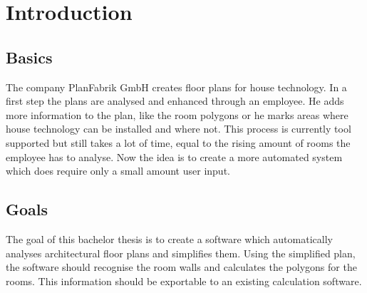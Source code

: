 \chapter{Introduction}
\section{Basics}
The company PlanFabrik GmbH creates floor plans for house technology. In a first step the plans are analysed and enhanced through an employee. He adds more information to the plan, like the room polygons or he marks areas where house technology can be installed and where not.
\newline
\newline
This process is currently tool supported but still takes a lot of time, equal to the rising amount of rooms the employee has to analyse. Now the idea is to create a more automated system which does require only a small amount user input.

\section{Goals}
The goal of this bachelor thesis is to create a software which automatically analyses architectural floor plans and simplifies them. Using the simplified plan, the software should recognise the room walls and calculates the polygons for the rooms. This information should be exportable to an existing calculation software.